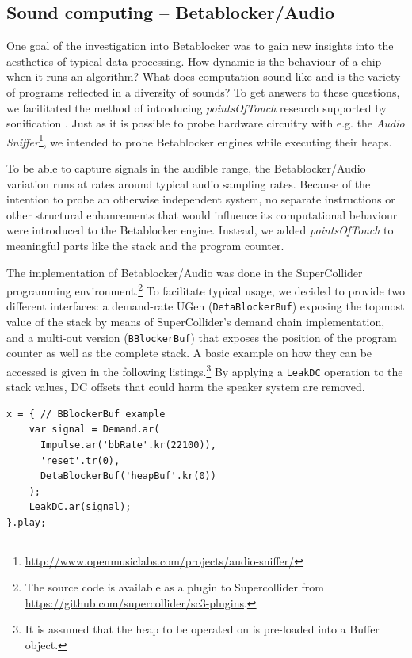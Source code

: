 \documentclass[letterpaper, 12pt]{article}
\begin{document}
\parskip 18pt

\subsection{Sound computing -- Betablocker/Audio} 
\label{sub:sound_computing}

One goal of the investigation into Betablocker was to gain new insights into the aesthetics of typical data processing.
How dynamic is the behaviour of a chip when it runs an algorithm?
What does computation sound like and is the variety of programs reflected in a diversity of sounds?
To get answers to these questions, we facilitated the method of introducing \emph{pointsOfTouch} research supported by sonification \citep{bovermann2011-the}.
Just as it is possible to probe hardware circuitry with e.g. the \emph{Audio Sniffer}\footnote{\url{http://www.openmusiclabs.com/projects/audio-sniffer/}}, we intended to probe Betablocker engines while executing their heaps.

To be able to capture signals in the audible range, the Betablocker/Audio variation runs at rates around typical audio sampling rates.
Because of the intention to probe an otherwise independent system, no separate instructions or other structural enhancements that would influence its computational behaviour were introduced to the Betablocker engine.
Instead, we added \emph{pointsOfTouch} to meaningful parts like the stack and the program counter.

The implementation of Betablocker/Audio was done in the SuperCollider programming environment.\footnote{The source code is available as a plugin to Supercollider from  \url{https://github.com/supercollider/sc3-plugins}.}
To facilitate typical usage, we decided to provide two different interfaces: a demand-rate UGen (\texttt{DetaBlockerBuf}) exposing the topmost value of the stack by means of SuperCollider's demand chain implementation, and a multi-out version (\texttt{BBlockerBuf}) that exposes the position of the program counter as well as  the complete stack.
A basic example on how they can be accessed is given in the following listings.\footnote{
It is assumed that the heap to be operated on is pre-loaded into a Buffer object.
}
By applying a \texttt{LeakDC} operation to the stack values, DC offsets that could harm the speaker system are removed.


\begin{Verbatim}[fontfamily=courier, xleftmargin=\parindent]
x = { // BBlockerBuf example
	var signal = Demand.ar(
	  Impulse.ar('bbRate'.kr(22100)), 
	  'reset'.tr(0),
	  DetaBlockerBuf('heapBuf'.kr(0))
	);
	LeakDC.ar(signal);
}.play;
\end{Verbatim}
\end{document}
